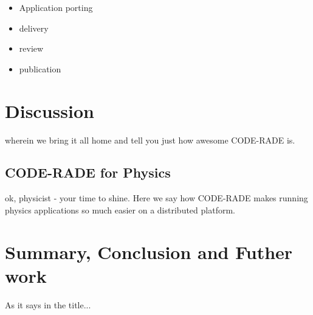 \documentclass[a4paper]{jpconf}
\begin{document}
\begin{itemize}
	\item Application porting
   \item delivery
   \item review
   \item publication
\end{itemize}

\section{Discussion}

wherein we bring it all home and tell you just how awesome CODE-RADE is.

\subsection{CODE-RADE for Physics}

ok, physicist - your time to shine. Here we say how CODE-RADE makes running physics applications so much easier on a distributed platform.

\section{Summary, Conclusion and Futher work}

As it says in the title...
\end{document}

